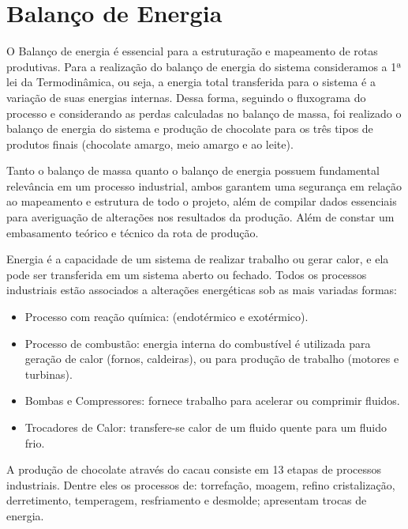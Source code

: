 \documentclass[
	12pt,				%
	openright,			%
	oneside,			%
	a4paper,			%
	english,			%
	french,				%
	spanish,			%
	brazil				%
	]{abntex2}
\begin{document}
\newpage
\chapter{Balanço de Energia}

O Balanço de energia é essencial para a estruturação e mapeamento de rotas produtivas. Para a realização do balanço de energia do sistema consideramos a 1ª lei da Termodinâmica, ou seja, a energia total transferida para o sistema é a variação de suas energias internas. Dessa forma, seguindo o fluxograma do processo e considerando as perdas calculadas no balanço de massa, foi realizado o balanço de energia do sistema e produção de chocolate para os três tipos de produtos finais (chocolate amargo, meio amargo e ao leite).

Tanto o balanço de massa quanto o balanço de energia possuem fundamental relevância em um processo industrial, ambos garantem uma segurança em relação ao mapeamento e estrutura de todo o projeto, além de compilar dados essenciais para averiguação de alterações nos resultados da produção.  Além de constar um embasamento teórico e técnico da rota de produção. 

Energia é a capacidade de um sistema de realizar trabalho ou gerar calor, e ela pode ser transferida em um sistema aberto ou fechado. Todos os processos industriais estão associados a alterações energéticas sob as mais variadas formas:

\begin{itemize}
\item Processo com reação química: (endotérmico e exotérmico).
\item Processo de combustão: energia interna do combustível é utilizada para geração de calor (fornos, caldeiras), ou para produção de trabalho (motores e turbinas).
\item Bombas e Compressores: fornece trabalho para acelerar ou comprimir fluidos.
\item Trocadores de Calor: transfere-se calor de um fluido quente para um fluido frio.
\end{itemize}

A produção de chocolate através do cacau consiste em 13 etapas de processos industriais. Dentre eles os processos de: torrefação, moagem, refino cristalização, derretimento, temperagem, resfriamento e desmolde; apresentam trocas de energia.
 
\end{document}
